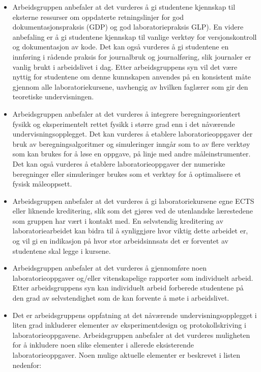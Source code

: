 \documentclass{article}
\begin{document}
\begin{itemize}
  \item Arbeidsgruppen anbefaler at det vurderes å gi studentene kjennskap til eksterne ressurser om oppdaterte retningslinjer for god dokumentasjonspraksis (GDP) og god laboratoriepraksis GLP). En videre anbefaling er å gi studentene kjennskap til vanlige verktøy for versjonskontroll og dokumentasjon av kode. Det kan også vurderes å gi studentene en innføring i rådende praksis for journalbruk og journalføring, slik journaler er vanlig brukt i arbeidslivet i dag. Etter arbeidsgruppens syn vil det være nyttig for studentene om denne kunnskapen anvendes på en konsistent måte gjennom alle laboratoriekursene, uavhengig av hvilken faglærer som gir den teoretiske undervisningen.

  \item Arbeidsgruppen anbefaler at det vurderes å integrere beregningsorientert fysikk og eksperimentelt rettet fysikk i større grad enn i det nåværende undervisningsopplegget. Det kan vurderes å etablere laboratorieoppgaver der bruk av beregningsalgoritmer og simuleringer inngår som to av flere verktøy som kan brukes for å løse en oppgave, på linje med andre måleinstrumenter. Det kan også vurderes å etablere laboratorieoppgaver der numeriske beregninger eller simuleringer brukes som et verktøy for å optimalisere et fysisk måleoppsett.

  \item Arbeidsgruppen anbefaler at det vurderes å gi laboratoriekursene egne ECTS eller liknende kreditering, slik som det gjøres ved de utenlandske lærestedene som gruppen har vært i kontakt med. En selvstendig kreditering av laboratoriearbeidet kan bidra til å synliggjøre hvor viktig dette arbeidet er, og vil gi en indikasjon på hvor stor arbeidsinnsats det er forventet av studentene skal legge i kursene.

  \item Arbeidsgruppen anbefaler at det vurderes å gjennomføre noen laboratorieoppgaver og/eller vitenskapelige rapporter som individuelt arbeid. Etter arbeidsgruppens syn kan individuelt arbeid forberede studentene på den grad av selvstendighet som de kan forvente å møte i arbeidslivet.

  \item Det er arbeidsgruppens oppfatning at det nåværende undervisningsopplegget i liten grad inkluderer elementer av eksperimentdesign og protokollskriving i laboratorieoppgavene. Arbeidsgruppen anbefaler at det vurderes muligheten for å inkludere noen slike elementer i allerede eksisterende laboratorieoppgaver. Noen mulige aktuelle elementer er beskrevet i listen nedenfor:
    

\end{itemize}
\end{document}
